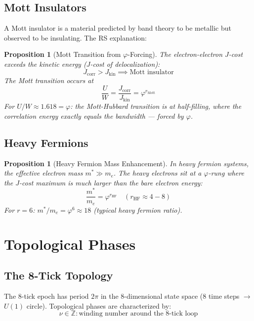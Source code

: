 \documentclass[12pt,a4paper]{article}
\newtheorem{proposition}[theorem]{Proposition}
\theoremstyle{definition}
\theoremstyle{remark}
\begin{document}
\subsection{Mott Insulators}

A Mott insulator is a material predicted by band theory to be metallic but 
observed to be insulating. The RS explanation:

\begin{proposition}[Mott Transition from $\varphi$-Forcing]
The electron-electron $J$-cost exceeds the kinetic energy ($J$-cost of delocalization):
\begin{equation}
J_\mathrm{corr} > J_\mathrm{kin} \implies \text{Mott insulator}
\end{equation}
The Mott transition occurs at
\begin{equation}
\frac{U}{W} = \frac{J_\mathrm{corr}}{J_\mathrm{kin}} = \varphi^{r_\mathrm{Mott}}
\end{equation}
For $U/W \approx 1.618 = \varphi$: the Mott-Hubbard transition is at half-filling, 
where the correlation energy exactly equals the bandwidth --- forced by $\varphi$.
\end{proposition}

\subsection{Heavy Fermions}

\begin{proposition}[Heavy Fermion Mass Enhancement]
In heavy fermion systems, the effective electron mass $m^* \gg m_e$.
The heavy electrons sit at a $\varphi$-rung where the $J$-cost 
maximum is much larger than the bare electron energy:
\begin{equation}
\frac{m^*}{m_e} = \varphi^{r_\mathrm{HF}} \quad (r_\mathrm{HF} \approx 4 - 8)
\end{equation}
For $r = 6$: $m^*/m_e = \varphi^6 \approx 18$ (typical heavy fermion ratio).
\end{proposition}

\section{Topological Phases}

\subsection{The 8-Tick Topology}

The 8-tick epoch has period $2\pi$ in the 8-dimensional state space (8 time steps 
$\to$ $U(1)$ circle). Topological phases are characterized by:
\begin{equation}
\nu \in \mathbb{Z}: \text{winding number around the 8-tick loop}
\end{equation}
\end{document}
